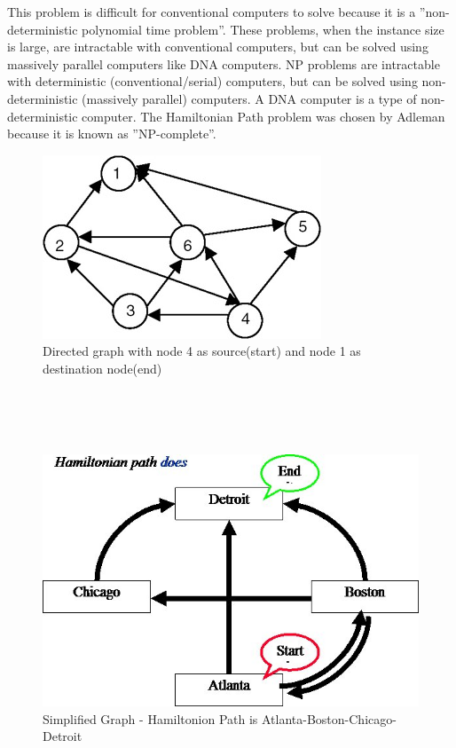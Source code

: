 This problem is difficult for conventional computers to solve because it is a  ”non-deterministic  polynomial  time  problem”.  These  problems,  when the  instance  size  is  large,  are  intractable  with  conventional  computers, but   can   be   solved   using   massively   parallel   computers   like   DNA computers.     NP     problems     are     intractable     with     deterministic (conventional/serial)   computers,   but   can   be   solved   using   non-deterministic (massively parallel) computers. A DNA computer is a type of non-deterministic  computer.  The  Hamiltonian  Path  problem  was  chosen by Adleman because it is known as ”NP-complete”.
  \begin{figure}[h!]
    \centering
      \includegraphics[width=\textwidth]{images/graphHPP}
      \caption{Directed graph with node 4 as source(start) and node 1 as destination node(end)}
  \end{figure}
    \\ \\ \\
  \begin{figure}
      \centering
      \includegraphics[width=\textwidth]{images/hpp_converted}
      \caption{Simplified Graph - Hamiltonion Path is Atlanta-Boston-Chicago-Detroit}
  \end{figure}
